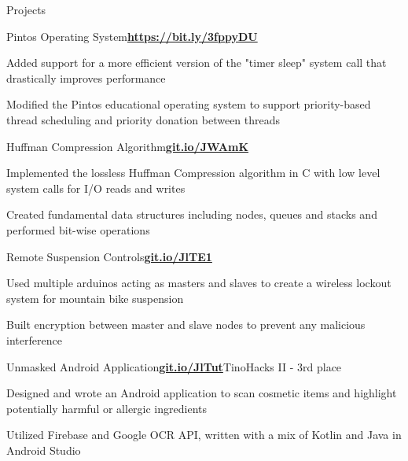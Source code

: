 \documentclass{resume}
\begin{document}
\begin{rSection}{\large Projects}

\begin{rSubsection}{Pintos Operating System}{\href{https://bit.ly/3fppyDU}{\bf{{https://bit.ly/3fppyDU}}}}{}{}
\item Added support for a more efficient version of the "timer sleep" system call that drastically improves performance 
\item Modified the Pintos educational operating system to support priority-based thread scheduling and priority donation between threads   
\end{rSubsection}
 
\begin{rSubsection}{Huffman Compression Algorithm}{\href{https://git.io/JWAmK}{\bf{{git.io/JWAmK}}}}{}{}
\item Implemented the lossless Huffman Compression algorithm in C with low level system calls for I/O reads and writes
\item Created fundamental data structures including nodes, queues and stacks and performed bit-wise operations
\end{rSubsection}

\begin{rSubsection}{Remote Suspension Controls}{\href{https://git.io/JlTE1}{{\bf{git.io/JlTE1}}}}{}{}
\item Used multiple arduinos acting as masters and slaves to create a wireless lockout system for mountain bike suspension
\item Built encryption between master and slave nodes to prevent any malicious interference
\end{rSubsection}

\begin{rSubsection}{Unmasked Android Application}{\href{https://git.io/JlTut}{\bf{{git.io/JlTut}}}}{TinoHacks II - 3rd place}{}
\item Designed and wrote an Android application to scan cosmetic items and highlight potentially harmful or allergic ingredients
\item Utilized Firebase and Google OCR API, written with a mix of Kotlin and Java in Android Studio
\end{rSubsection}

\end{rSection}
\end{document}
